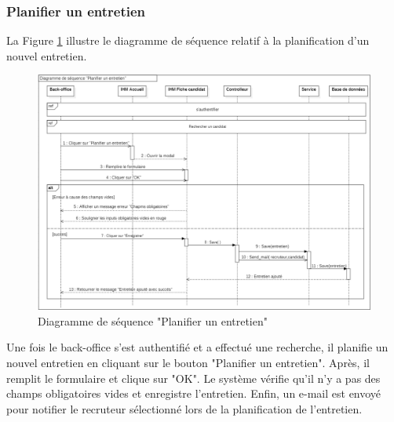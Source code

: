  \subsubsection{Planifier un entretien}
 La Figure \ref{fig:sequence_planifier_entretien} illustre le diagramme de séquence relatif à la planification d'un nouvel entretien.
 \newpage
 \begin{figure}[H]
     \centering
     \includegraphics[scale=0.51]{img/sequence planifier entretien.png}
     \caption{Diagramme de séquence "Planifier un entretien"}
     \label{fig:sequence_planifier_entretien}
 \end{figure}
 Une fois le back-office s'est authentifié et a effectué une recherche, il planifie un nouvel entretien en cliquant sur le bouton "Planifier un entretien". Après, il remplit le formulaire et clique sur "OK". Le système vérifie qu'il n'y a pas des champs obligatoires vides et enregistre l'entretien. Enfin, un e-mail est envoyé pour  notifier le recruteur sélectionné lors de la planification de l'entretien.
